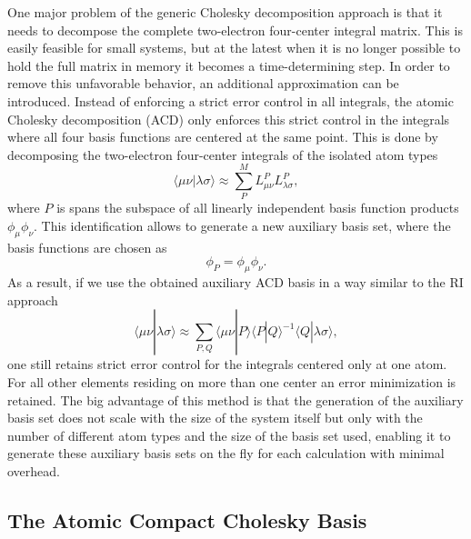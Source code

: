 One major problem of the generic Cholesky decomposition approach is that it needs to decompose the complete two-electron four-center integral matrix. This is easily feasible for small systems, but at the latest when it is no longer possible to hold the full matrix in memory it becomes a time-determining step. In order to remove this unfavorable behavior, an additional approximation can be introduced. Instead of enforcing a strict error control in all integrals, the atomic Cholesky decomposition (ACD) only enforces this strict control in the integrals where all four basis functions are centered at the same point. This is done by decomposing the two-electron four-center integrals of the isolated atom types
\begin{equation}\label{ACDMAtrix}
\langle \mu \nu | \lambda \sigma \rangle \approx \sum_P^M L^P_{\mu\nu} L^P_{\lambda \sigma} ,
\end{equation}
where $P$ is spans the subspace of all linearly independent basis function products $\phi_\mu \phi_\nu$. This identification allows to generate a new auxiliary basis set, where the basis functions are chosen as $$\phi_P = \phi_\mu \phi_\nu .$$ 
As a result, if we use the obtained auxiliary ACD basis in a way similar to the RI approach
\begin{equation}\label{ACDFormalism}
\langle \mu \nu | \lambda \sigma \rangle \approx \sum_{P,Q} \langle \mu \nu | P \rangle \langle P | Q \rangle^{-1} \langle Q | \lambda \sigma \rangle ,
\end{equation} 
one still retains strict error control for the integrals centered only at one atom. For all other elements residing on more than one center an error minimization is retained. The big advantage of this method is that the generation of the auxiliary basis set does not scale with the size of the system itself but only with the number of different atom types and the size of the basis set used, enabling it to generate these auxiliary basis sets on the fly for each calculation with minimal overhead.

\subsection{The Atomic Compact Cholesky Basis}

